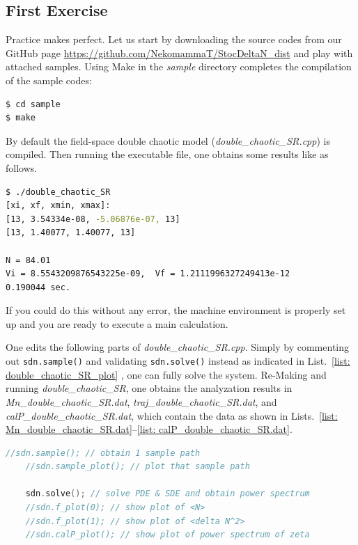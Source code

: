 \documentclass[aps, prd
, preprint
, nofootinbib 
, notitlepage
, superscriptaddress
, longbibliography
]{revtex4-1}
\newcommand{\YT}[1]{\textcolor{blue}{\sffamily [YT : #1]}}
\begin{document}
\subsection{First Exercise}

Practice makes perfect. 
Let us start by downloading the source codes from our GitHub page \url{https://github.com/NekomammaT/StocDeltaN_dist} and play with attached samples.
Using Make in the \textit{sample} directory completes the compilation of the sample codes:
\begin{lstlisting}[language = bash, numbers = none]
$ cd sample
$ make
\end{lstlisting}
By default the field-space double chaotic model (\emph{double\_chaotic\_SR.cpp}) is compiled. Then running the executable file, one obtains some results like as follows.
\begin{lstlisting}[language = bash, numbers = none]
$ ./double_chaotic_SR
[xi, xf, xmin, xmax]:
[13, 3.54334e-08, -5.06876e-07, 13]
[13, 1.40077, 1.40077, 13]

N = 84.01
Vi = 8.5543209876543225e-09,  Vf = 1.2111996327249413e-12
0.190044 sec.
\end{lstlisting}
If you could do this without any error, the machine environment is properly set up and you are ready to execute a main calculation.

One edits the following parts of \textit{double\_chaotic\_SR.cpp}. Simply by commenting out \texttt{sdn.sample()} and validating \texttt{sdn.solve()} instead as 
indicated in List.~\ref{list: double_chaotic_SR_plot} \YT{modify comments},
one can fully solve the system.
Re-Making and running \textit{double\_chaotic\_SR}, one obtains the analyzation results in 
\textit{Mn\_double\_chaotic\_SR.dat}, \textit{traj\_double\_chaotic\_SR.dat},
and \textit{calP\_double\_chaotic\_SR.dat}, which contain the data as shown in Lists.~\ref{list: Mn_double_chaotic_SR.dat}--\ref{list: calP_double_chaotic_SR.dat}.

\begin{lstlisting}[language = C++, caption=\textit{sample/double\_chaotic\_SR.cpp}, label = list: double_chaotic_SR_plot, firstnumber = 77]
	//sdn.sample(); // obtain 1 sample path
	//sdn.sample_plot(); // plot that sample path 
	
	sdn.solve(); // solve PDE & SDE and obtain power spectrum  
	//sdn.f_plot(0); // show plot of <N>
	//sdn.f_plot(1); // show plot of <delta N^2> 
	//sdn.calP_plot(); // show plot of power spectrum of zeta
\end{lstlisting}
\end{document}
